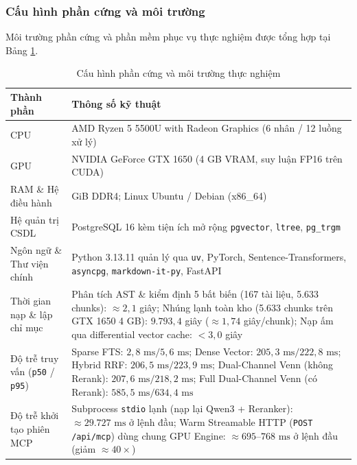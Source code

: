 \subsubsection{Cấu hình phần cứng và môi trường}
Môi trường phần cứng và phần mềm phục vụ thực nghiệm được tổng hợp tại Bảng \ref{tab:env}.

\begin{table}[H]
\centering
\caption{Cấu hình phần cứng và môi trường thực nghiệm}
\label{tab:env}
\small\setlength{\tabcolsep}{5pt}\begin{tabularx}{\textwidth}{p{4.6cm}>{\raggedright\arraybackslash}X}
\toprule
\textbf{Thành phần} & \textbf{Thông số kỹ thuật} \\
\midrule
CPU & AMD Ryzen 5 5500U with Radeon Graphics (6 nhân / 12 luồng xử lý) \\
\addlinespace[2pt]
GPU & NVIDIA GeForce GTX 1650 (4 GB VRAM, suy luận FP16 trên CUDA) \\
\addlinespace[2pt]
RAM \& Hệ điều hành & 22 GiB DDR4; Linux Ubuntu / Debian (x86\_64) \\
\addlinespace[2pt]
Hệ quản trị CSDL & PostgreSQL 16 kèm tiện ích mở rộng \texttt{pgvector}, \texttt{ltree}, \texttt{pg\_trgm} \\
\addlinespace[2pt]
Ngôn ngữ \& Thư viện chính & Python 3.13.11 quản lý qua \texttt{uv}, PyTorch, Sentence-Transformers, \texttt{asyncpg}, \texttt{markdown-it-py}, FastAPI \\
\addlinespace[2pt]
Thời gian nạp \& lập chỉ mục & Phân tích AST \& kiểm định 5 bất biến (167 tài liệu, 5.633 chunks): $\approx 2,1$ giây; Nhúng lạnh toàn kho (5.633 chunks trên GTX 1650 4 GB): $9.793,4$ giây ($\approx 1,74$ giây/chunk); Nạp ấm qua differential vector cache: $< 3,0$ giây \\
\addlinespace[2pt]
Độ trễ truy vấn (\texttt{p50} / \texttt{p95}) & Sparse FTS: $2,8\text{ ms} / 5,6\text{ ms}$; Dense Vector: $205,3\text{ ms} / 222,8\text{ ms}$; Hybrid RRF: $206,5\text{ ms} / 223,9\text{ ms}$; Dual-Channel Venn (không Rerank): $207,6\text{ ms} / 218,2\text{ ms}$; Full Dual-Channel Venn (có Rerank): $585,5\text{ ms} / 634,4\text{ ms}$ \\
\addlinespace[2pt]
Độ trễ khởi tạo phiên MCP & Subprocess \texttt{stdio} lạnh (nạp lại Qwen3 + Reranker): $\approx 29.727\text{ ms}$ ở lệnh đầu; Warm Streamable HTTP (\texttt{POST /api/mcp}) dùng chung GPU Engine: $\approx 695\text{--}768\text{ ms}$ ở lệnh đầu (giảm $\approx 40\times$) \\
\bottomrule
\end{tabularx}
\end{table}

